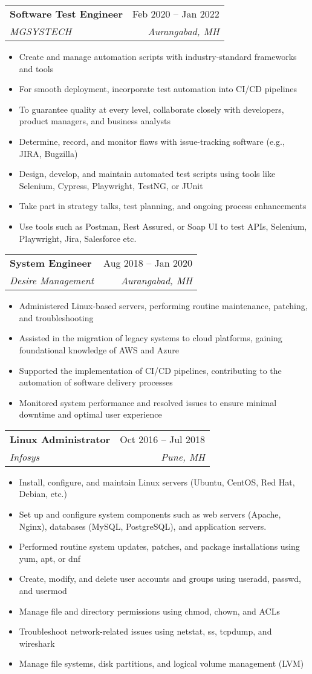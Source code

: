 \documentclass[letterpaper,11pt]{article}
\makeatletter
\newcommand{\resumeItem}[1]{
  \item\small{
    {#1 \vspace{-2pt}}
  }
}
\newcommand{\resumeSubheading}[4]{
  \vspace{-2pt}\item
    \begin{tabular*}{0.97\textwidth}[t]{l@{\extracolsep{\fill}}r}
      \textbf{#1} & #2 \\
      \textit{\small#3} & \textit{\small #4} \\
    \end{tabular*}\vspace{-7pt}
}
\newcommand{\resumeSubSubheading}[2]{
    \item
    \begin{tabular*}{0.97\textwidth}{l@{\extracolsep{\fill}}r}
      \textit{\small#1} & \textit{\small #2} \\
    \end{tabular*}\vspace{-7pt}
}
\newcommand{\resumeSubHeadingListEnd}{\end{itemize}}
\newcommand{\resumeItemListStart}{\begin{itemize}}
\newcommand{\resumeItemListEnd}{\end{itemize}\vspace{-5pt}}
\makeatother
\begin{document}

    \resumeSubheading
      {Software Test Engineer}{Feb 2020 -- Jan 2022}
      {MGSYSTECH}{Aurangabad, MH}
      \resumeItemListStart
        \resumeItem{Create and manage automation scripts with industry-standard frameworks and tools}
        \resumeItem{For smooth deployment, incorporate test automation into CI/CD pipelines}
        \resumeItem{To guarantee quality at every level, collaborate closely with developers, product managers, and business analysts}
        \resumeItem{Determine, record, and monitor flaws with issue-tracking software (e.g., JIRA, Bugzilla)}
        \resumeItem{Design, develop, and maintain automated test scripts using tools like Selenium, Cypress, Playwright, TestNG, or JUnit}
        \resumeItem{Take part in strategy talks, test planning, and ongoing process enhancements}
        \resumeItem{Use tools such as Postman, Rest Assured, or Soap UI to test APIs, Selenium, Playwright, Jira, Salesforce etc.}
      \resumeItemListEnd

    \resumeSubheading
      {System Engineer}{Aug 2018 -- Jan 2020}
      {Desire Management}{Aurangabad, MH}
      \resumeItemListStart
        \resumeItem{Administered Linux-based servers, performing routine maintenance, patching, and troubleshooting}
        \resumeItem{Assisted in the migration of legacy systems to cloud platforms, gaining foundational knowledge of AWS and Azure}
        \resumeItem{Supported the implementation of CI/CD pipelines, contributing to the automation of software delivery processes}
        \resumeItem{Monitored system performance and resolved issues to ensure minimal downtime and optimal user experience}
      \resumeItemListEnd

      \resumeSubheading
      {Linux Administrator}{Oct 2016 -- Jul 2018}
      {Infosys}{Pune, MH}
      \resumeItemListStart
        \resumeItem{Install, configure, and maintain Linux servers (Ubuntu, CentOS, Red Hat, Debian, etc.)}
        \resumeItem{Set up and configure system components such as web servers (Apache, Nginx), databases (MySQL, PostgreSQL), and application servers.}
        \resumeItem{Performed routine system updates, patches, and package installations using yum, apt, or dnf}
        \resumeItem{Create, modify, and delete user accounts and groups using useradd, passwd, and usermod}
        \resumeItem{Manage file and directory permissions using chmod, chown, and ACLs}
        \resumeItem{Troubleshoot network-related issues using netstat, ss, tcpdump, and wireshark}
        \resumeItem{Manage file systems, disk partitions, and logical volume management (LVM)}
        \resumeItemListEnd
        
\end{document}
